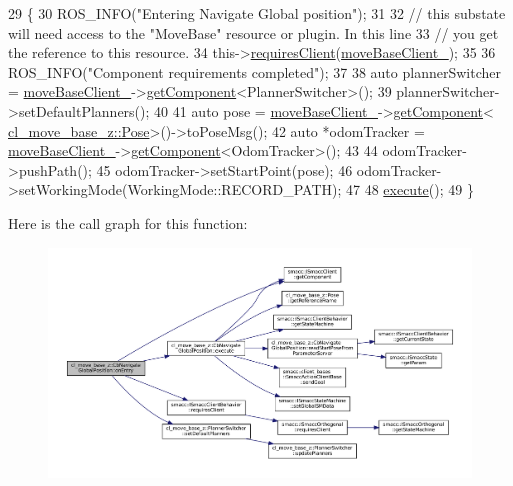\begin{DoxyCode}
29     \{
30         ROS\_INFO(\textcolor{stringliteral}{"Entering Navigate Global position"});
31 
32         \textcolor{comment}{// this substate will need access to the "MoveBase" resource or plugin. In this line}
33         \textcolor{comment}{// you get the reference to this resource.}
34         this->\hyperlink{classsmacc_1_1ISmaccClientBehavior_a32b16e99e3b4cb289414203dc861a440}{requiresClient}(\hyperlink{classcl__move__base__z_1_1CbNavigateGlobalPosition_a460d6b43834cb52baa94d22cd3a6fd2b}{moveBaseClient\_});
35 
36         ROS\_INFO(\textcolor{stringliteral}{"Component requirements completed"});
37 
38         \textcolor{keyword}{auto} plannerSwitcher = \hyperlink{classcl__move__base__z_1_1CbNavigateGlobalPosition_a460d6b43834cb52baa94d22cd3a6fd2b}{moveBaseClient\_}->\hyperlink{classsmacc_1_1ISmaccClient_adef78db601749ca63c19e74a27cb88cc}{getComponent}<PlannerSwitcher>();
39         plannerSwitcher->setDefaultPlanners();
40 
41         \textcolor{keyword}{auto} pose = \hyperlink{classcl__move__base__z_1_1CbNavigateGlobalPosition_a460d6b43834cb52baa94d22cd3a6fd2b}{moveBaseClient\_}->\hyperlink{classsmacc_1_1ISmaccClient_adef78db601749ca63c19e74a27cb88cc}{getComponent}<
      \hyperlink{classcl__move__base__z_1_1Pose}{cl\_move\_base\_z::Pose}>()->toPoseMsg();
42         \textcolor{keyword}{auto} *odomTracker = \hyperlink{classcl__move__base__z_1_1CbNavigateGlobalPosition_a460d6b43834cb52baa94d22cd3a6fd2b}{moveBaseClient\_}->\hyperlink{classsmacc_1_1ISmaccClient_adef78db601749ca63c19e74a27cb88cc}{getComponent}<OdomTracker>();
43 
44         odomTracker->pushPath();
45         odomTracker->setStartPoint(pose);
46         odomTracker->setWorkingMode(WorkingMode::RECORD\_PATH);
47 
48         \hyperlink{classcl__move__base__z_1_1CbNavigateGlobalPosition_a0b8525ea9e4388b27cb1f9b1e06a3b63}{execute}();
49     \}
\end{DoxyCode}
Here is the call graph for this function\+:
\nopagebreak
\begin{figure}[H]
\begin{center}
\leavevmode
\includegraphics[width=350pt]{classcl__move__base__z_1_1CbNavigateGlobalPosition_a66d8b0555ef2945bc108dcd5171be292_cgraph}
\end{center}
\end{figure}
